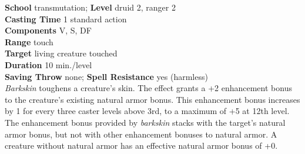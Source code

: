 \textbf{School} transmutation; \textbf{Level} druid 2, ranger 2\\
\textbf{Casting Time} 1 standard action\\
\textbf{Components} V, S, DF\\
\textbf{Range} touch\\
\textbf{Target} living creature touched\\
\textbf{Duration} 10 min./level\\
\textbf{Saving Throw} none; \textbf{Spell Resistance} yes (harmless)\\
\textit{Barkskin }toughens a creature's skin. The effect grants a +2 enhancement bonus to the creature's existing natural armor bonus. This enhancement bonus increases by 1 for every three caster levels above 3rd, to a maximum of +5 at 12th level.\\
The enhancement bonus provided by \textit{barkskin }stacks with the target's natural armor bonus, but not with other enhancement bonuses to natural armor. A creature without natural armor has an effective natural armor bonus of +0.\\
